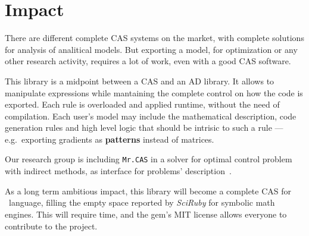 
\section{Impact}
\label{sec:impact}

There are different complete CAS systems on the market, with complete solutions for analysis of analitical models. But exporting a model, for optimization or any other research activity, requires a lot of work, even with a good CAS software.

This library is a midpoint between a CAS and an AD library. It allows to manipulate expressions while mantaining the complete control on how the code is exported. Each rule is overloaded and applied runtime, without the need of compilation. Each user's model may include the mathematical description, code generation rules and high level logic that should be intrisic to such a rule --- e.g.~exporting gradients as \textbf{patterns} instead of matrices.

Our research group is including \texttt{Mr.CAS} in a solver for optimal control problem with indirect methods, as interface for problems' description~\cite{biral2016notes}.

As a long term ambitious impact, this library will become a complete CAS for \Ruby~language, filling the empty space reported by \emph{SciRuby} for symbolic math engines. This will require time, and the gem's MIT license allows everyone to contribute to the project.
